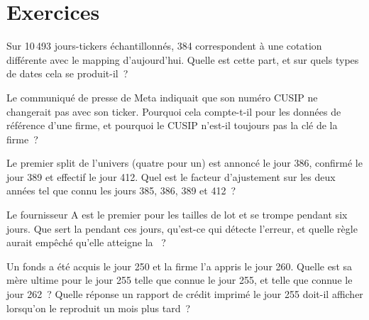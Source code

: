 \section{Exercices}

\begin{exercise}[$\star$]\label{exo:pl:reference-data-and-symbology-services:1}
Sur 10\,493 jours-tickers échantillonnés, 384 correspondent à une cotation différente avec le mapping d'aujourd'hui. Quelle est cette part, et sur quels types de
dates cela se produit-il~?
\end{exercise}

\begin{exercise}[$\star$]\label{exo:pl:reference-data-and-symbology-services:2}
Le communiqué de presse de Meta indiquait que son numéro CUSIP ne changerait pas avec son ticker. Pourquoi cela compte-t-il pour les données de référence d'une firme, et
pourquoi le CUSIP n'est-il toujours pas la clé de la firme~?
\end{exercise}

\begin{exercise}[$\star$]\label{exo:pl:reference-data-and-symbology-services:3}
Le premier split de l'univers (quatre pour un) est annoncé le jour 386, confirmé le jour 389 et effectif le jour 412. Quel est le facteur d'ajustement sur les deux années tel que connu
les jours 385, 386, 389 et 412~?
\end{exercise}

\begin{exercise}[$\star\star$]\label{exo:pl:reference-data-and-symbology-services:4}
Le fournisseur A est le premier pour les tailles de lot et se trompe pendant six jours. Que sert la  pendant ces jours, qu'est-ce qui détecte
l'erreur, et quelle règle aurait empêché qu'elle atteigne la ~?
\end{exercise}

\begin{exercise}[$\star\star$]\label{exo:pl:reference-data-and-symbology-services:5}
Un fonds a été acquis le jour 250 et la firme l'a appris le jour 260. Quelle est sa mère ultime pour le jour 255 telle que connue le jour 255, et
telle que connue le jour 262~? Quelle réponse un rapport de crédit imprimé le jour 255 doit-il afficher lorsqu'on le reproduit un mois plus tard~?
\end{exercise}

